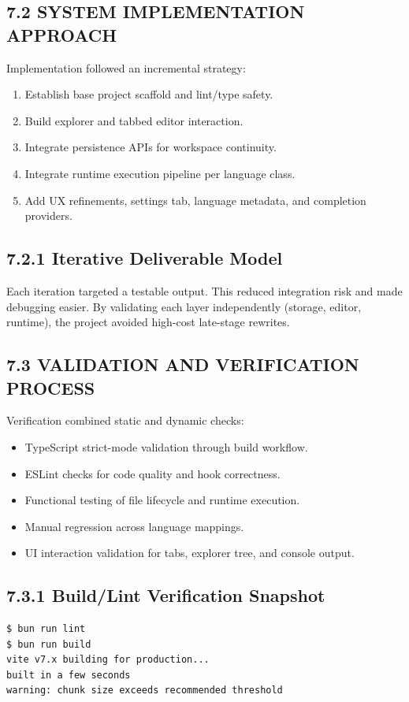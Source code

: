 \subsection{7.2 SYSTEM IMPLEMENTATION APPROACH}
Implementation followed an incremental strategy:
\begin{enumerate}[leftmargin=8mm]
\item Establish base project scaffold and lint/type safety.
\item Build explorer and tabbed editor interaction.
\item Integrate persistence APIs for workspace continuity.
\item Integrate runtime execution pipeline per language class.
\item Add UX refinements, settings tab, language metadata, and completion providers.
\end{enumerate}

\subsection*{7.2.1 Iterative Deliverable Model}
Each iteration targeted a testable output. This reduced integration risk and made debugging easier. By validating each layer independently (storage, editor, runtime), the project avoided high-cost late-stage rewrites.

\subsection{7.3 VALIDATION AND VERIFICATION PROCESS}
Verification combined static and dynamic checks:
\begin{itemize}[leftmargin=8mm]
\item TypeScript strict-mode validation through build workflow.
\item ESLint checks for code quality and hook correctness.
\item Functional testing of file lifecycle and runtime execution.
\item Manual regression across language mappings.
\item UI interaction validation for tabs, explorer tree, and console output.
\end{itemize}

\subsection*{7.3.1 Build/Lint Verification Snapshot}
\begin{lstlisting}[style=javascriptstyle,caption={Command Verification Snapshot}]
$ bun run lint
$ bun run build
vite v7.x building for production...
built in a few seconds
warning: chunk size exceeds recommended threshold
\end{lstlisting}

